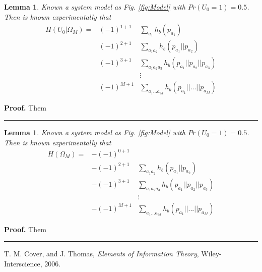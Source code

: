 \documentclass[a4paper,10pt]{article}
\newtheorem{mylemma}[mytheorem]{Lemma}
\newenvironment{myproof}[1][Proof]{\textbf{#1.} }{\ \rule{0.5em}{0.5em}}
\begin{document}
\begin{mylemma}
 \label{lemm:1}
  Known a system model as Fig. \ref{fig:Model} with $Pr(U_0=1)=0.5$. Then is known 
experimentally that
\begin{equation}
 \begin{matrix}
 H(U_0|\Omega_M)= & (-1)^{1+1} & \sum \limits_{a_1}         h_b(p_{a_1}) \\
 ~                & (-1)^{2+1} & \sum \limits_{a_1 a_2}     h_b(p_{a_1}||p_{a_2}) \\ 
 ~                & (-1)^{3+1}  & \sum \limits_{a_1 a_2 a_3} h_b(p_{a_1}||p_{a_2}||p_{a_3}) \\ 
 ~                & ~ & \vdots \\
 ~                & (-1)^{M+1}  & \sum \limits_{a_1 ... a_M} h_b(p_{a_1}|| ... ||p_{a_M}) 
 \end{matrix}
\end{equation}

\end{mylemma}
\begin{myproof}
Them
\end{myproof}


\begin{mylemma}
 \label{lemm:2}
  Known a system model as Fig. \ref{fig:Model} with $Pr(U_0=1)=0.5$. Then is known 
experimentally that
\begin{equation}
 \begin{matrix}
 H(\Omega_M)= & -(-1)^{0+1} & ~ \\
 ~            & -(-1)^{2+1} & \sum \limits_{a_1 a_2}     h_b(p_{a_1}||p_{a_2}) \\ 
 ~            & -(-1)^{3+1}  & \sum \limits_{a_1 a_2 a_3} h_b(p_{a_1}||p_{a_2}||p_{a_3}) \\ 
 ~            & ~ & \vdots \\
 ~            & -(-1)^{M+1}  & \sum \limits_{a_1 ... a_M} h_b(p_{a_1}|| ... ||p_{a_M}) 
 \end{matrix}
\end{equation}

\end{mylemma}
\begin{myproof}
Them
\end{myproof}

\begin{thebibliography}{99}
T. M. Cover, and J. Thomas, \textit{Elements of Information Theory}, Wiley-Interscience, 2006.

\end{thebibliography}
\end{document}
